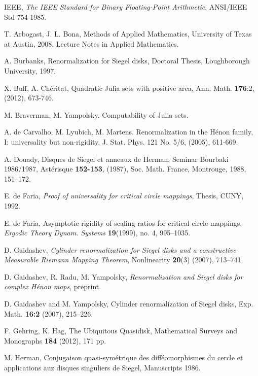 \begin{thebibliography}{}
IEEE, {\it The IEEE Standard for Binary Floating-Point Arithmetic}, ANSI/IEEE Std 754-1985. 

 T. Arbogast, J. L. Bona, Methods of Applied Mathematics, University of Texas at Austin, 2008. Lecture Notes in Applied Mathematics.

 A. Burbanks, Renormalization for Siegel disks, Doctoral Thesis, Loughborough University, 1997.

 X. Buff, A. Ch\'eritat, Quadratic Julia sets with positive area, Ann. Math. {\bf 176}:2, (2012), 673-746.

 M. Braverman, M. Yampolsky. Computability of Julia sets. 

 A. de Carvalho, M. Lyubich, M. Martens. Renormalization in the H\'enon family, I: universality but non-rigidity, 
J. Stat. Phys. 121 No. 5/6, (2005), 611-669.

 A. Douady, Disques de Siegel et anneaux de Herman, Seminar Bourbaki 1986/1987, Ast\'erisque \textbf{152-153}, (1987), Soc. Math. France, Montrouge, 1988, 151--172. 

 E. de Faria, {\it Proof of universality for critical circle mappings}, Thesis, CUNY, 1992.

 E. de Faria, Asymptotic rigidity of scaling ratios for critical circle mappings, {\it Ergodic Theory Dynam. Systems} {\bf 19}(1999), no. 4, 995--1035.

  D. Gaidashev, {\it Cylinder renormalization for Siegel disks and a constructive Measurable Riemann Mapping Theorem},  Nonlinearity {\bf 20}(3) (2007), 713--741. 

 D. Gaidashev, R. Radu, M. Yampolsky, {\it Renormalization and Siegel disks for complex H\'enon maps}, preprint.

 D. Gaidashev and M. Yampolsky, Cylinder renormalization of Siegel disks, Exp. Math. \textbf{16:2}  (2007), 215--226.


 F. Gehring, K. Hag,  The Ubiquitous Quasidisk, Mathematical Surveys and Monographs \textbf{184} (2012), 171 pp.

 M. Herman, Conjugaison quasi-sym\'etrique des diff\'eomorphismes du cercle et applications auz disques singuliers de Siegel, Manuscripts 1986.


\end{thebibliography}
